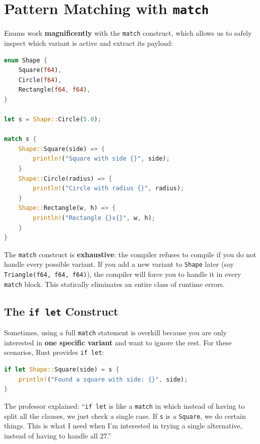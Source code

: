 \section{Pattern Matching with \texttt{match}}

Enums work \textbf{magnificently} with the \texttt{match} construct, which allows us to safely inspect which variant is active and extract its payload:

\begin{lstlisting}[language=Rust]
enum Shape {
    Square(f64),
    Circle(f64),
    Rectangle(f64, f64),
}

let s = Shape::Circle(5.0);

match s {
    Shape::Square(side) => {
        println!("Square with side {}", side);
    }
    Shape::Circle(radius) => {
        println!("Circle with radius {}", radius);
    }
    Shape::Rectangle(w, h) => {
        println!("Rectangle {}x{}", w, h);
    }
}
\end{lstlisting}

The \texttt{match} construct is \textbf{exhaustive}: the compiler refuses to compile if you do not handle every possible variant. If you add a new variant to \texttt{Shape} later (say \texttt{Triangle(f64, f64, f64)}), the compiler will force you to handle it in every \texttt{match} block. This statically eliminates an entire class of runtime errors.

\subsection{The \texttt{if let} Construct}

Sometimes, using a full \texttt{match} statement is overkill because you are only interested in \textbf{one specific variant} and want to ignore the rest. For these scenarios, Rust provides \texttt{if let}:

\begin{lstlisting}[language=Rust]
if let Shape::Square(side) = s {
    println!("Found a square with side: {}", side);
}
\end{lstlisting}

The professor explained: ``\texttt{if let} is like a \texttt{match} in which instead of having to split all the clauses, we just check a single case. If \texttt{s} is a \texttt{Square}, we do certain things. This is what I need when I'm interested in trying a single alternative, instead of having to handle all 27.''

